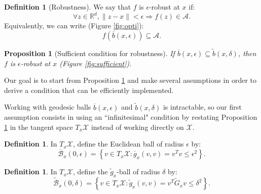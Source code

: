 \documentclass[entropy,article,submit,pdftex,moreauthors]{Definitions/mdpi}
\newcommand{\R}{\ensuremath{\mathbb{R}}}
\theoremstyle{plain}
\newtheorem{proposition}[theorem]{Proposition}
\theoremstyle{definition}
\newtheorem{definition}[theorem]{Definition}
\newcommand{\A}{\mathcal{A}}
\newcommand{\B}{\mathcal{B}}
\newcommand{\X}{\mathcal{X}}
\newcommand{\gb}{\overline{g}}
\begin{document}
\begin{definition}[Robustness]
We say that $f$ is $\epsilon$-robust at $x$ if:
\begin{equation}
\label{eq:robust_condition}
    \forall z \in \R^d, \|z - x\| < \epsilon \Rightarrow f(z) \in \A. 
\end{equation}
Equivalently, we can write (Figure \ref{fig:opti}):
\begin{equation}
    f(\overline{b}(x, \epsilon)) \subseteq \A.
\end{equation}
\end{definition}

\begin{proposition}[Sufficient condition for robustness]
    \label{prop:sufficient}
    If $\overline{b}(x, \epsilon) \subseteq \tilde{b}(x, \delta)$, then $f$ is $\epsilon$-robust at $x$ (Figure \ref{fig:sufficient}).
\end{proposition}
Our goal is to start from Proposition \ref{prop:sufficient} and make several assumptions in order to derive a condition that can be efficiently implemented.

Working with geodesic balls $\overline{b}(x, \epsilon)$ and $\tilde{b}(x, \delta)$ is intractable, so our first assumption consists in using an ``infinitesimal" condition by restating Proposition \ref{prop:sufficient} in the tangent space $T_x \X$ instead of working directly on $\X$.

\begin{definition}
    In $T_x\X$, define the Euclidean ball of radius $\epsilon$ by:
    \begin{equation*}
        \overline{\B}_x(0, \epsilon) = \left\{v \in T_x\X : \gb_x(v,v) = v^T v \leq \epsilon^2 \right\}.
    \end{equation*}
\end{definition}

\begin{definition}
    In $T_x\X$, define the $\tilde{g}_x$-ball of radius $\delta$ by:
    \begin{equation*}
        \widetilde{\B}_x(0, \delta) = \left\{v \in T_x\X : \tilde{g}_x(v,v) = v^T \widetilde{G}_x v \leq \delta^2 \right\}.
    \end{equation*}
\end{definition}
\end{document}
